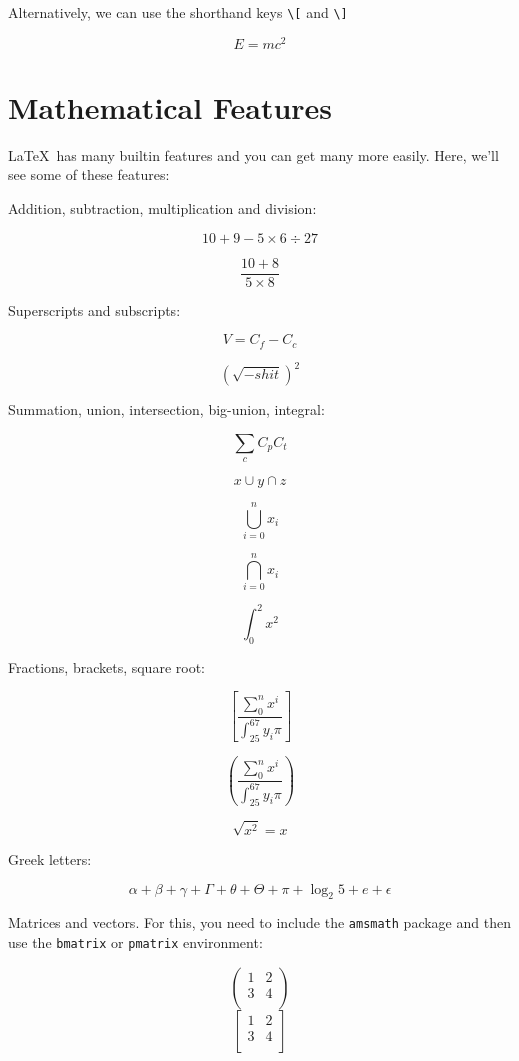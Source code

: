 \documentclass{article}
\begin{document}
Alternatively, we can use the shorthand keys \verb|\[| and \verb|\]|

\[
  E = mc^2
\]

\section{Mathematical Features}
\LaTeX\ has many builtin features and you can get many more easily. Here, we'll see some of these
features:

Addition, subtraction, multiplication and division:

\[
  10 + 9 - 5 \times 6 \div 27
\]

\[
  \frac{10 + 8}{5 \times 8}
\]

Superscripts and subscripts:

\[
  V = C_f - C_c
\]

\[
  {(\sqrt{-shit})}^2
\]

Summation, union, intersection, big-union, integral:

\[
  \sum_{c} C_p C_t
\]

\[
  x \cup y \cap z
\]

\[
  \bigcup_{i=0}^n x_i
\]

\[
  \bigcap_{i=0}^n x_i
\]

\[
  \int_0^2 x^2
\]

Fractions, brackets, square root:

\[
  \left[
    \frac{
      \sum_0^n x^i
    }{
      \int_{25}^{67} y_i \pi
    }
  \right]

\]

\[
  \left(
    \frac{
      \sum_0^n x^i
    }{
      \int_{25}^{67} y_i \pi
    }
  \right)
\]

\[
  \sqrt{x^2} = x
\]

Greek letters:

\[
  \alpha + \beta + \gamma + \Gamma + \theta + \Theta + \pi + \log_{2}{5} + e + \epsilon
\]

Matrices and vectors. For this, you need to include the \texttt{amsmath} package and then use the
\texttt{bmatrix} or \texttt{pmatrix} environment:

\[
  \begin{pmatrix}
    1   &   2 \\
    3   &   4 \\
  \end{pmatrix}
\]
\[
  \begin{bmatrix}
    1   &   2 \\
    3   &   4 \\
  \end{bmatrix}
\]
\end{document}
